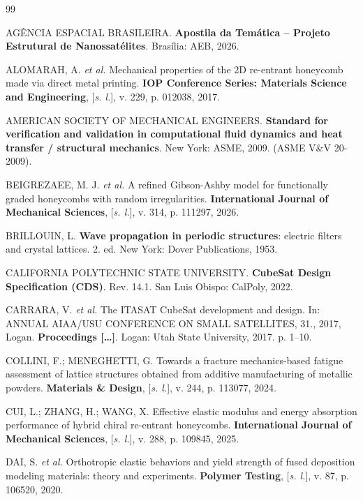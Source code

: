 \begin{thebibliography}{99}
\setlength{\itemsep}{\onelineskip}
\SingleSpacing
\raggedright

AGÊNCIA ESPACIAL BRASILEIRA. \textbf{Apostila da Temática -- Projeto Estrutural de Nanossatélites}. Brasília: AEB, 2026.

ALOMARAH, A. \textit{et al.} Mechanical properties of the 2D re-entrant honeycomb made via direct metal printing. \textbf{IOP Conference Series: Materials Science and Engineering}, [\textit{s. l.}], v. 229, p. 012038, 2017.

AMERICAN SOCIETY OF MECHANICAL ENGINEERS. \textbf{Standard for verification and validation in computational fluid dynamics and heat transfer / structural mechanics}. New York: ASME, 2009. (ASME V\&V 20-2009).

BEIGREZAEE, M. J. \textit{et al.} A refined Gibson-Ashby model for functionally graded honeycombs with random irregularities. \textbf{International Journal of Mechanical Sciences}, [\textit{s. l.}], v. 314, p. 111297, 2026.

BRILLOUIN, L. \textbf{Wave propagation in periodic structures}: electric filters and crystal lattices. 2. ed. New York: Dover Publications, 1953.

CALIFORNIA POLYTECHNIC STATE UNIVERSITY. \textbf{CubeSat Design Specification (CDS)}. Rev. 14.1. San Luis Obispo: CalPoly, 2022.

CARRARA, V. \textit{et al.} The ITASAT CubeSat development and design. In: ANNUAL AIAA/USU CONFERENCE ON SMALL SATELLITES, 31., 2017, Logan. \textbf{Proceedings [\ldots]}. Logan: Utah State University, 2017. p. 1--10.

COLLINI, F.; MENEGHETTI, G. Towards a fracture mechanics-based fatigue assessment of lattice structures obtained from additive manufacturing of metallic powders. \textbf{Materials \& Design}, [\textit{s. l.}], v. 244, p. 113077, 2024.

CUI, L.; ZHANG, H.; WANG, X. Effective elastic modulus and energy absorption performance of hybrid chiral re-entrant honeycombs. \textbf{International Journal of Mechanical Sciences}, [\textit{s. l.}], v. 288, p. 109845, 2025.

DAI, S. \textit{et al.} Orthotropic elastic behaviors and yield strength of fused deposition modeling materials: theory and experiments. \textbf{Polymer Testing}, [\textit{s. l.}], v. 87, p. 106520, 2020.


\end{thebibliography}
